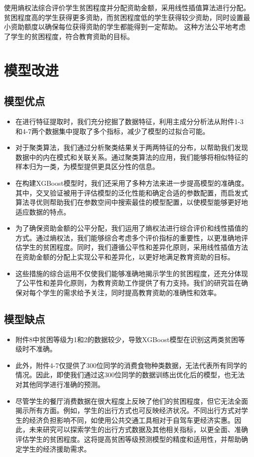 \documentclass{article}
\begin{document}
使用熵权法综合评价学生贫困程度并分配资助金额，采用线性插值算法进行分配。
贫困程度高的学生获得更多资助，而贫困程度低的学生获得较少资助，同时设置最小资助额度以确保每位获得资助的学生都能得到一定帮助。
这种方法公平地考虑了学生的贫困程度，符合教育资助的目标。

\section{模型改进}

\subsection{模型优点}
\begin{itemize}
  \item 在进行特征提取时，我们充分挖掘了数据特征，利用主成分分析法从附件1-3和4-7两个数据集中提取了多个指标，减少了模型的过拟合可能。
  \item 对于聚类算法，我们通过分析聚类结果关于两两特征的分布，以帮助我们发现数据中的内在模式和关联关系。通过聚类算法的应用，我们能够将相似特征的样本归为一类，为模型提供更具区分性的信息。
  \item 在构建XGBoost模型时，我们还采用了多种方法来进一步提高模型的准确度。其中，交叉验证被用于评估模型的泛化性能和确定合适的参数配置，而启发式算法寻优则帮助我们在参数空间中搜索最佳的模型配置，以使模型能够更好地适应数据的特点。
  \item 为了确保资助金额的公平分配，我们运用了熵权法进行综合评价和线性插值的方式。通过熵权法，我们能够综合考虑多个评价指标的重要性，以更准确地评估学生的贫困程度。同时，我们遵循公平性和差异化原则，采用线性插值方法在资助金额的分配上实现公平和差异化，以更好地满足教育资助的目标。
  \item 这些措施的综合运用不仅使我们能够准确地揭示学生的贫困程度，还充分体现了公平性和差异化原则，为教育资助工作提供了有力支持。我们的研究旨在确保对每个学生的需求给予关注，同时提高教育资助的准确性和效率。
\end{itemize}

\subsection{模型缺点}
\begin{itemize}
  \item 附件8中贫困等级为1和2的数据较少，导致XGBoost模型在识别这两类贫困等级时不准确。
  \item 此外，附件4-7仅提供了300位同学的消费食物种类数据，无法代表所有同学的情况。因此，即使我们通过这300位同学的数据训练出优化后的模型，也无法对其他同学进行准确的预测。
  \item 尽管学生的餐厅消费数据在很大程度上反映了他们的贫困程度，但它无法全面揭示所有方面。例如，学生的出行方式也可反映经济状况。不同出行方式对学生的经济负担影响不同，如使用公共交通工具相对于自驾车更经济实惠。因此，未来研究可以探索学生的出行方式数据及其他相关指标，以更全面、准确评估学生的贫困程度。这将提高贫困等级预测模型的精度和适用性，并帮助确定学生的经济援助需求。
\end{itemize}
\end{document}
